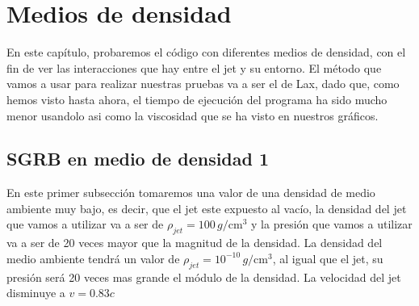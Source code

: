 \documentclass[12pt,a4paper]{book}
\begin{document}
\chapter{Medios de densidad}

En este capítulo, probaremos el código con diferentes medios de densidad, con el fin de ver las interacciones que hay entre el jet y su entorno. El método que vamos a usar para realizar nuestras pruebas va a ser el de Lax, dado que, como hemos visto hasta ahora, el tiempo de ejecución del programa ha sido mucho menor usandolo asi como la viscosidad que se ha visto en nuestros gráficos.

\section{SGRB en medio de densidad 1}
En este primer subsección tomaremos una valor de una densidad de medio ambiente muy bajo, es decir, que el jet este expuesto al vacío, la densidad del jet que vamos a utilizar va a ser de $\rho_{jet} = 100 \, g/\mathrm{cm}^3 $ y la presión que vamos a utilizar va a ser de 20 veces mayor que la magnitud de la densidad. La densidad del medio ambiente tendrá un valor de $\rho_{jet} = 10^{-10} \, g/\mathrm{cm}^3 $, al igual que el jet, su presión será 20 veces mas grande el módulo de la densidad. La velocidad del jet disminuye a $v = 0.83c$
\end{document}
